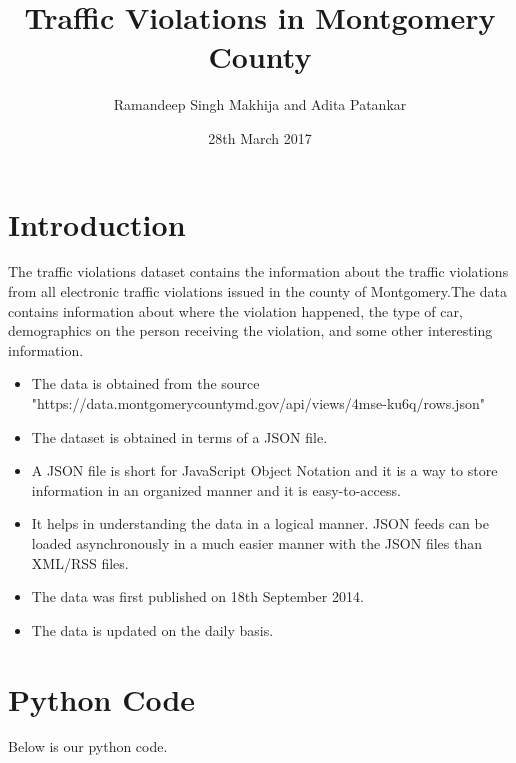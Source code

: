 \documentclass[11pt,oneside]{article}
\title{Traffic Violations in Montgomery County}
\author{Ramandeep Singh Makhija and Adita Patankar}
\date{28th March 2017}
\begin{document}
\maketitle


\vspace{2cm}
\section{Introduction}
\newcommand{\sectionbreak}{\clearpage}
{\color{black}
The traffic violations dataset contains the information about the traffic violations from all electronic traffic violations issued in the county of Montgomery.The data contains information about where the violation happened, the type of car, demographics on the person receiving the violation, and some other interesting information.


\begin{itemize}
	 \item The data is obtained from the source "https://data.montgomerycountymd.gov/api/views/4mse-ku6q/rows.json"
    	 \item The dataset is obtained in terms of a JSON file.
    	 \item  A JSON file is short for JavaScript Object Notation and it is a way to store information in an organized manner and it is easy-to-access.
	 \item It helps in understanding the data in a logical manner. JSON feeds can be loaded asynchronously in a much easier manner with the JSON files than XML/RSS files. 
	 \item The data was first published on 18th September 2014.
    	 \item The data is updated on the daily basis.
\end{itemize}
}

\section{Python Code}

{\color{black}
Below is our python code.  
}
\end{document}
